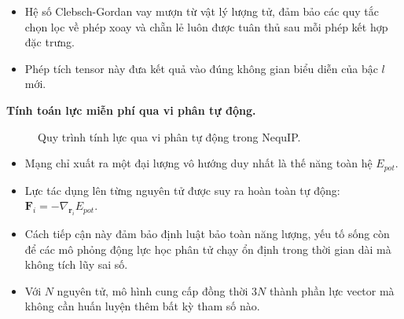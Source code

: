 \begin{itemize}
    \item Hệ số Clebsch-Gordan vay mượn từ vật lý lượng tử, đảm bảo các quy tắc chọn lọc về phép xoay và chẵn lẻ luôn được tuân thủ sau mỗi phép kết hợp đặc trưng.
    \item Phép tích tensor này đưa kết quả vào đúng không gian biểu diễn của bậc $l$ mới.
\end{itemize}

\vspace{0.5em}
\textbf{Tính toán lực miễn phí qua vi phân tự động.}

\begin{figure}[H]
\centering
{}
\caption{Quy trình tính lực qua vi phân tự động trong NequIP.}
\label{fig:nequip-autograd}
\end{figure}

\begin{itemize}
    \item Mạng chỉ xuất ra một đại lượng vô hướng duy nhất là thế năng toàn hệ $E_{pot}$.
    \item Lực tác dụng lên từng nguyên tử được suy ra hoàn toàn tự động: $\mathbf{F}_i = -\nabla_{\mathbf{r}_i} E_{pot}$.
    \item Cách tiếp cận này đảm bảo định luật bảo toàn năng lượng, yếu tố sống còn để các mô phỏng động lực học phân tử chạy ổn định trong thời gian dài mà không tích lũy sai số.
    \item Với $N$ nguyên tử, mô hình cung cấp đồng thời $3N$ thành phần lực vector mà không cần huấn luyện thêm bất kỳ tham số nào.
\end{itemize}

